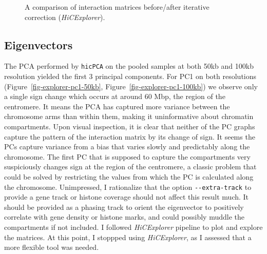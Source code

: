 \documentclass[
  11pt,
  a4paper,
]{scrbook}
\let\oldemph\emph
\renewcommand\emph[1]{\oldemph{\color{gray}#1}}
\begin{document}
\begin{figure}
\begin{minipage}{0.50\linewidth}
{}


\end{minipage}%

\caption{\label{fig-explorer-pooled-norm-normcorr}A comparison of
interaction matrices before/after iterative correction
(\emph{HiCExplorer}).}

\end{figure}%

\subsection{Eigenvectors}\label{eigenvectors}

The PCA performed by \texttt{hicPCA} on the pooled samples at both 50kb
and 100kb resolution yielded the first 3 principal components. For PC1
on both resolutions (Figure~\ref{fig-explorer-pc1-50kb},
Figure~\ref{fig-explorer-pc1-100kb}) we observe only a single sign
change which occurs at around 60 Mbp, the region of the centromere. It
means the PCA has captured more variance between the chromosome arms
than within them, making it uninformative about chromatin compartments.
Upon visual inspection, it is clear that neither of the PC graphs
capture the pattern of the interaction matrix by its change of sign. It
seems the PCs capture variance from a bias that varies slowly and
predictably along the chromosome. The first PC that is supposed to
capture the compartments very suspiciously changes sign at the region of
the centromere, a classic problem that could be solved by restricting
the values from which the PC is calculated along the chromosome.
Unimpressed, I rationalize that the option \texttt{-\/-extra-track} to
provide a gene track or histone coverage should not affect this result
much. It should be provided as a phasing track to orient the eigenvector
to positively correlate with gene density or histone marks, and could
possibly muddle the compartments if not included. I followed
\emph{HiCExplorer} pipeline to plot and explore the matrices. At this
point, I stoppped using \emph{HiCExplorer}, as I assessed that a more
flexible tool was needed.
\end{document}
